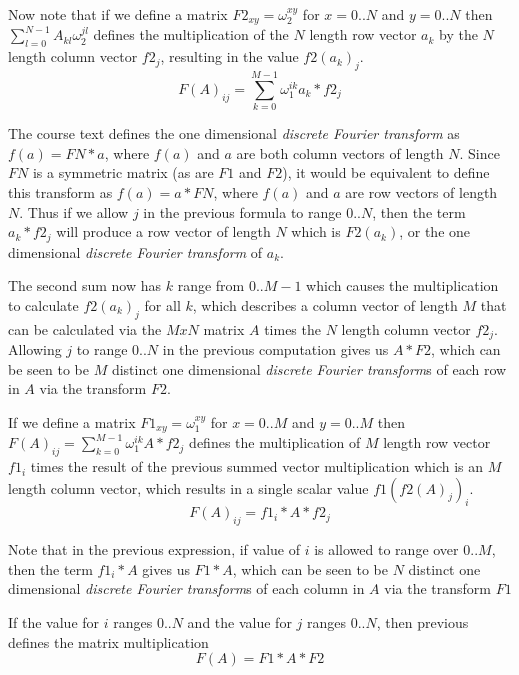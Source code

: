 \documentclass{article}
\begin{document}
\begin{enumerate}
\par Now note that if we define a matrix $F2_{xy} = \omega_2^{xy}$ for $x=0..N$ and $y=0..N$ then $\sum_{l=0}^{N-1} A_{kl} \omega_2^{jl}$ defines the multiplication of the $N$ length row vector $a_k$ by the $N$ length column vector $f2_j$, resulting in the value $f2(a_k)_j$. 
$$F(A)_{ij} = \sum_{k=0}^{M-1} \omega_1^{ik} a_k * f2_j$$

\par The course text defines the one dimensional \emph{discrete Fourier transform} as $f(a) = FN * a$, where $f(a)$ and $a$ are both column vectors of length $N$.  Since $FN$ is a symmetric matrix (as are $F1$ and $F2$), it would be equivalent to define this transform as $f(a) = a * FN$, where $f(a)$ and $a$ are row vectors of length $N$. Thus if we allow $j$ in the previous formula to range $0..N$, then the term $a_k * f2_j$ will produce a row vector of length $N$ which is $F2(a_k)$, or the one dimensional \emph{discrete Fourier transform} of $a_k$.

\par The second sum now has $k$ range from $0..M-1$ which causes the multiplication to calculate $f2(a_k)_j$ for all $k$, which describes a column vector of length $M$ that can be calculated via the $M x N$ matrix $A$ times the $N$ length column vector $f2_j$. Allowing $j$ to range $0..N$ in the previous computation gives us $A * F2$, which can be seen to be $M$ distinct one dimensional \emph{discrete Fourier transform}s of each row in $A$ via the transform $F2$. 

\par If we define a matrix $F1_{xy} = \omega_1^{xy}$ for $x=0..M$ and $y=0..M$ then $F(A)_{ij} = \sum_{k=0}^{M-1} \omega_1^{ik} A * f2_j$ defines the multiplication of $M$ length row vector $f1_i$ times the result of the previous summed vector multiplication which is an $M$ length column vector, which results in a single scalar value $f1(f2(A)_j)_i$.
$$F(A)_{ij} = f1_i * A * f2_j$$

\par Note that in the previous expression, if value of $i$ is allowed to range over $0..M$, then the term $f1_i * A$ gives us $F1 * A$, which can be seen to be $N$ distinct one dimensional \emph{discrete Fourier transform}s of each column in $A$ via the transform $F1$

If the value for $i$ ranges $0..N$ and the value for $j$ ranges $0..N$, then previous defines the matrix multiplication
$$F(A) = F1 * A * F2$$


\end{enumerate}
\end{document}
